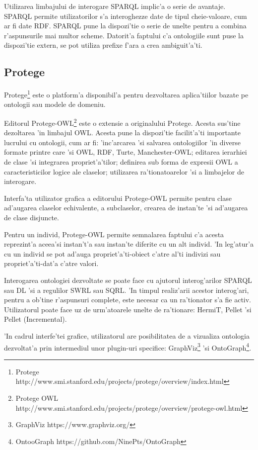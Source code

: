 \documentclass[12pt,a4paper,twoside]{report}
\begin{document}
Utilizarea limbajului de interogare SPARQL implic'a o serie de avantaje. SPARQL permite utilizatorilor s'a interoghezze date de tipul cheie-valoare, cum ar fi date RDF. SPARQL pune la dispozi'tie o serie de unelte pentru a combina r'aspunsurile mai multor scheme. Datorit'a faptului c'a ontologiile sunt puse la dispozi'tie extern, se pot utiliza prefixe f'ara a crea ambiguit'a'ti.

\subsection{Protege}
Protege\footnote{Protege http://www.smi.stanford.edu/projects/protege/overview/index.html} este o platform'a disponibil'a pentru dezvoltarea aplica'tiilor bazate pe ontologii sau modele de domeniu. 

Editorul Protege-OWL\footnote{Protege OWL http://www.smi.stanford.edu/projects/protege/overview/protege-owl.html} este o extensie a originalului Protege. Acesta sus'tine dezoltarea 'in limbajul OWL. Acesta pune la dispozi'tie facilit'a'ti importante lucrului cu ontologii, cum ar fi: 'inc'arcarea 'si salvarea ontologiilor 'in diverse formate printre care 'si OWL, RDF, Turte, Manchester-OWL; editarea ierarhiei de clase 'si integrarea propriet'a'tilor; definirea sub forma de expresii OWL a caracteristicilor logice ale claselor; utilizarea ra'tionatoarelor 'si a limbajelor de interogare.

Interfa'ta utilizator grafica a editorului Protege-OWL permite pentru clase ad'augarea claselor echivalente, a subclaselor, crearea de instan'te 'si ad'augarea de clase disjuncte. 

Pentru un individ, Protege-OWL permite semnalarea faptului c'a acesta reprezint'a aceea'si instan't'a sau instan'te diferite cu un alt individ. 'In leg'atur'a cu un individ se pot ad'auga propriet'a'ti-obiect c'atre al'ti indivizi sau propriet'a'ti-dat'a c'atre valori.

Interogarea ontologiei dezvoltate se poate face cu ajutorul interog'arilor SPARQL sau DL 'si a regulilor SWRL sau SQRL. 'In timpul realiz'arii acestor interog'ari, pentru a ob'tine r'aspunsuri complete, este necesar ca un ra'tionator s'a fie activ. Utilizatorul poate face uz de urm'atoarele unelte de ra'tionare: HermiT, Pellet 'si Pellet (Incremental).

'In cadrul interfe'tei grafice, utilizatorul are posibilitatea de a vizualiza ontologia dezvoltat'a prin intermediul unor plugin-uri specifice: GraphViz\footnote{GraphViz https://www.graphviz.org/} 'si OntoGraph\footnote{OntooGraph https://github.com/NinePts/OntoGraph}.
\end{document}
